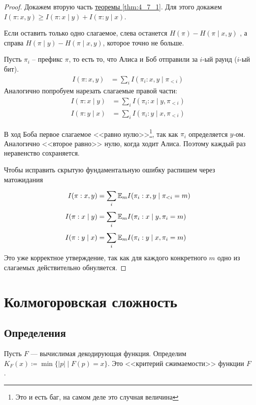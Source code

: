 \label{proof:thm_4_7_1}
\begin{proof}
Докажем вторую часть \hyperref[thm:4_7_1]{теоремы \ref{thm:4_7_1}}.
Для этого докажем $ I( \pi : x, y) \ge I( \pi : x \mid y) + I(\pi : y  \mid x)$. 

Если оставить только одно слагаемое,  слева останется
$ H( \pi ) - H( \pi \mid x, y) $
, а справа 
$ H( \pi \mid y ) - H( \pi \mid x, y) $, которое точно не больше.

Пусть $  \pi_i$ -- префикс $  \pi$, то есть то, что Алиса и Боб отправили за $ i$-ый раунд ($ i$-ый бит).
\begin{align*}
	I( \pi : x, y) &= \tag{Chain rule} \sum_{i} I( \pi_i : x, y \mid \pi_{< i}) 
\end{align*}
Аналогично попробуем нарезать слагаемые правой части:
\begin{align*}
	I( \pi : x \mid y) & = \sum_{i}^{} I( \pi_i : x \mid y, \pi_{<i}) \\
	I( \pi : y \mid x) & = \sum_{i}^{} I( \pi_i : y \mid x, \pi_{<i}) 
\end{align*}

В ход Боба первое слагаемое <<равно нулю>>\footnote{Это и есть баг, на самом деле это случная величина}, так как $  \pi_i$ определяется $ y $-ом. Аналогично <<второе равно>> нулю, когда ходит Алиса. Поэтому каждый раз неравенство сохраняется. 

Чтобы исправить скрытую фундаментальную ошибку распишем через матожидания
\begin{align*}
	I( \pi : x, y) &= \sum_{i}^{} \mathbb{E}_{m}I( \pi_i : x, y \mid \pi_{< i} = m) \\
	I( \pi : x \mid y) & = \sum_{i}^{} \mathbb{E}_m I( \pi_i : x \mid y, \pi_i = m) \\
	I( \pi : y \mid x) & = \sum_{i}^{} \mathbb{E}_mI( \pi_i : y \mid x, \pi_i = m) 
\end{align*}
Это уже корректное утверждение, так как для каждого конкретного $m$ одно из слагаемых действительно обнуляется.
\end{proof}

\chapter{Колмогоровская сложность}
\section{Определения}

Пусть $ F$ --- вычислимая декодирующая функция.
Определим $ K_F(x) \coloneqq \min \{\lvert p \rvert \mid F(p) = x\}$. Это <<критерий сжимаемости>> функции $ F$.


